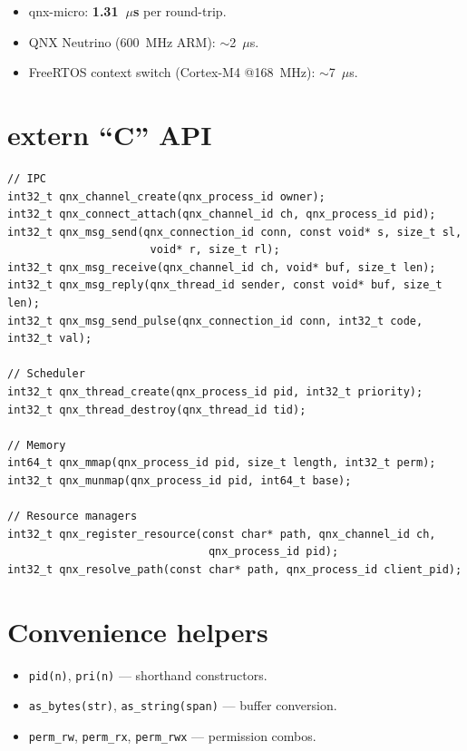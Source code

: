 \documentclass[11pt]{article}
\begin{document}
\begin{itemize}[leftmargin=2em, nosep]
\item qnx-micro: \textbf{1.31~$\mu$s} per round-trip.
\item QNX Neutrino (600~MHz ARM): $\sim$2~$\mu$s.
\item FreeRTOS context switch (Cortex-M4 @168~MHz): $\sim$7~$\mu$s.
\end{itemize}

\section{extern ``C'' API}

\begin{Verbatim}[fontsize=\small,frame=single]
// IPC
int32_t qnx_channel_create(qnx_process_id owner);
int32_t qnx_connect_attach(qnx_channel_id ch, qnx_process_id pid);
int32_t qnx_msg_send(qnx_connection_id conn, const void* s, size_t sl,
                      void* r, size_t rl);
int32_t qnx_msg_receive(qnx_channel_id ch, void* buf, size_t len);
int32_t qnx_msg_reply(qnx_thread_id sender, const void* buf, size_t len);
int32_t qnx_msg_send_pulse(qnx_connection_id conn, int32_t code, int32_t val);

// Scheduler
int32_t qnx_thread_create(qnx_process_id pid, int32_t priority);
int32_t qnx_thread_destroy(qnx_thread_id tid);

// Memory
int64_t qnx_mmap(qnx_process_id pid, size_t length, int32_t perm);
int32_t qnx_munmap(qnx_process_id pid, int64_t base);

// Resource managers
int32_t qnx_register_resource(const char* path, qnx_channel_id ch,
                               qnx_process_id pid);
int32_t qnx_resolve_path(const char* path, qnx_process_id client_pid);
\end{Verbatim}

\section{Convenience helpers}

\begin{itemize}[leftmargin=2em, nosep]
\item \texttt{pid(n)}, \texttt{pri(n)} --- shorthand constructors.
\item \texttt{as\_bytes(str)}, \texttt{as\_string(span)} --- buffer conversion.
\item \texttt{perm\_rw}, \texttt{perm\_rx}, \texttt{perm\_rwx} --- permission combos.
\end{itemize}
\end{document}

